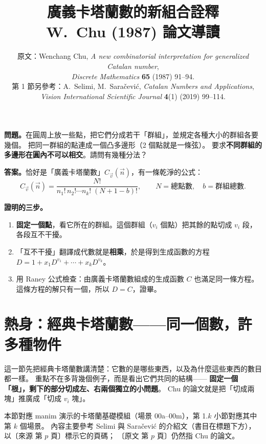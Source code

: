 \documentclass[11pt,a4paper]{article}
\title{\textbf{廣義卡塔蘭數的新組合詮釋}\\[0.3em]\large W.~Chu (1987) 論文導讀}
\author{\normalsize 原文：Wenchang Chu, \emph{A new combinatorial interpretation for generalized Catalan number},\\\normalsize
\emph{Discrete Mathematics} \textbf{65} (1987) 91--94.\\[0.2em]\normalsize
第 1 節另參考：A.~Selimi, M.~Saračević, \emph{Catalan Numbers and Applications},\\\normalsize
\emph{Vision International Scientific Journal} \textbf{4}(1) (2019) 99--114.}
\date{}
\newcommand{\vn}{\vec n}
\newcommand{\vv}{\vec v}
\newcommand{\Cv}{C_{\vv}}
\begin{document}
\maketitle
\vspace{-2.5em}

\begin{keybox}[一頁看懂]
\textbf{問題。}在圓周上放一些點，把它們分成若干「群組」，並規定各種大小的群組各要幾個。
把同一群組的點連成一個凸多邊形（2 個點就是一條弦）。
要求\textbf{不同群組的多邊形在圓內不可以相交}。請問有幾種分法？

\textbf{答案。}恰好是「廣義卡塔蘭數」$\Cv(\vn)$，有一條乾淨的公式：
\[
\Cv(\vn)=\frac{N!}{n_1!\,n_2!\cdots n_k!\;(N+1-b)!},\qquad
N=\text{總點數},\quad b=\text{群組總數}.
\]

\textbf{證明的三步。}
\begin{enumerate}[leftmargin=1.6em]
  \item \textbf{固定一個點}，看它所在的群組。這個群組（$v_i$ 個點）把其餘的點切成 $v_i$ 段，各段互不干擾。
  \item 「互不干擾」翻譯成代數就是\textbf{相乘}，於是得到生成函數的方程
        $D=1+x_1D^{v_1}+\cdots+x_kD^{v_k}$。
  \item 用 Raney 公式檢查：由廣義卡塔蘭數組成的生成函數 $C$ 也滿足同一條方程。
        這條方程的解只有一個，所以 $D=C$，證畢。
\end{enumerate}
\end{keybox}

\setcounter{tocdepth}{1}
\begingroup
\setlength{\parskip}{0pt}  %
\tableofcontents
\endgroup
\newpage

\section{熱身：經典卡塔蘭數——同一個數，許多種物件}\label{sec:catalan}

這一節先把經典卡塔蘭數講清楚：它數的是哪些東西，以及為什麼這些東西的數目都一樣。
重點不在多背幾個例子，而是看出它們共同的結構——
\textbf{固定一個「根」，剩下的部分切成左、右兩個獨立的小問題}。
Chu 的論文就是把「切成兩塊」推廣成「切成 $v_i$ 塊」。

本節對應 manim 演示的卡塔蘭基礎模組（場景 00a--00m），第 1.$k$ 小節對應其中第 $k$ 個場景。
內容主要參考 Selimi 與 Saračević 的介紹文（書目在標題下方），以〔來源 第 $p$ 頁〕標示它的頁碼；
〔原文 第 $p$ 頁〕仍然指 Chu 的論文。
\end{document}
